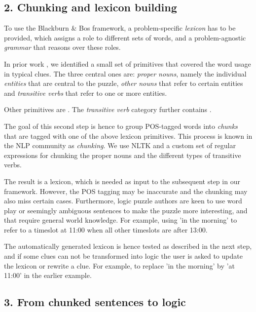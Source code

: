 \subsection{2. Chunking and lexicon building}
To use the Blackburn \& Bos framework, a problem-specific \textit{lexicon} has to be provided, which assigns a role to different sets of words, and a problem-agnostic \textit{grammar} that reasons over these roles.

In prior work , we identified a small set of primitives that covered the word usage in typical clues. The three central ones are: \textit{proper nouns}, namely the individual \textit{entities} that are central to the puzzle, \textit{other nouns} that refer to certain entities and \textit{transitive verbs} that refer to one or more entities.

Other primitives are . The \textit{transitive verb} category further contains .

The goal of this second step is hence to group POS-tagged words into \textit{chunks} that are tagged with one of the above lexicon primitives. This process is known in the NLP community as \textit{chunking}. We use NLTK and a custom set of regular expressions for chunking the proper nouns and the different types of transitive verbs. 

The result is a lexicon, which is needed as input to the subsequent step in our framework. However, the POS tagging may be inaccurate and the chunking may also miss certain cases. Furthermore, logic puzzle authors are keen to use word play or seemingly ambiguous sentences to make the puzzle more interesting, and that require general world knowledge. For example, using 'in the morning' to refer to a timeslot at 11:00 when all other timeslots are after 13:00.

The automatically generated lexicon is hence tested as described in the next step, and if some clues can not be transformed into logic the user is asked to update the lexicon or rewrite a clue. For example, to replace 'in the morning' by 'at 11:00' in the earlier example.

\subsection{3. From chunked sentences to logic}


